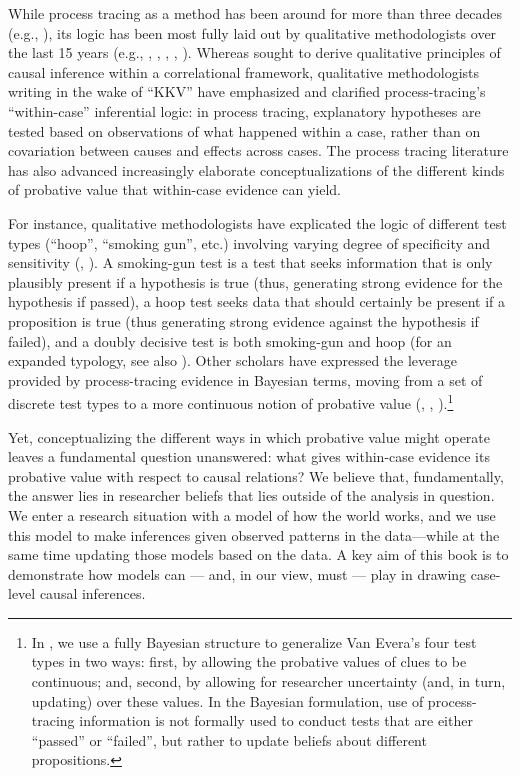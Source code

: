 \documentclass[12pt,]{book}
\let\rmarkdownfootnote\footnote%
\def\footnote{\protect\rmarkdownfootnote}
\begin{document}
While process tracing as a method has been around for more than three decades (e.g., \citet{george1985case}), its logic has been most fully laid out by qualitative methodologists over the last 15 years (e.g., \citet{bennett2014process}, \citet{george2005case}, \citet{brady2010rethinking}, \citet{Hall2003aligning}, \citet{mahoney2010after}). Whereas \citet{king1994designing} sought to derive qualitative principles of causal inference within a correlational framework, qualitative methodologists writing in the wake of ``KKV'' have emphasized and clarified process-tracing's ``within-case'' inferential logic: in process tracing, explanatory hypotheses are tested based on observations of what happened within a case, rather than on covariation between causes and effects across cases. The process tracing literature has also advanced increasingly elaborate conceptualizations of the different kinds of probative value that within-case evidence can yield.

For instance, qualitative methodologists have explicated the logic of different test types (``hoop'', ``smoking gun'', etc.) involving varying degree of specificity and sensitivity (\citet{collier2011understanding}, \citet{Mahony:Logic:2012}). A smoking-gun test is a test that seeks information that is only plausibly present if a hypothesis is true (thus, generating strong evidence for the hypothesis if passed), a hoop test seeks data that should certainly be present if a proposition is true (thus generating strong evidence against the hypothesis if failed), and a doubly decisive test is both smoking-gun and hoop (for an expanded typology, see also \citet{rohlfing2013comparative}). Other scholars have expressed the leverage provided by process-tracing evidence in Bayesian terms, moving from a set of discrete test types to a more continuous notion of probative value (\citet{fairfield2017explicit}, \citet{BennettAppendix}, \citet{humphreys2015mixing}).\footnote{In \citet{humphreys2015mixing}, we use a fully Bayesian structure to generalize Van Evera's four test types in two ways: first, by allowing the probative values of clues to be continuous; and, second, by allowing for researcher uncertainty (and, in turn, updating) over these values. In the Bayesian formulation, use of process-tracing information is not formally used to conduct tests that are either ``passed'' or ``failed'', but rather to update beliefs about different propositions.}

Yet, conceptualizing the different ways in which probative value might operate leaves a fundamental question unanswered: what gives within-case evidence its probative value with respect to causal relations? We believe that, fundamentally, the answer lies in researcher beliefs that lies outside of the analysis in question. We enter a research situation with a model of how the world works, and we use this model to make inferences given observed patterns in the data---while at the same time updating those models based on the data. A key aim of this book is to demonstrate how models can --- and, in our view, must --- play in drawing case-level causal inferences.
\end{document}
